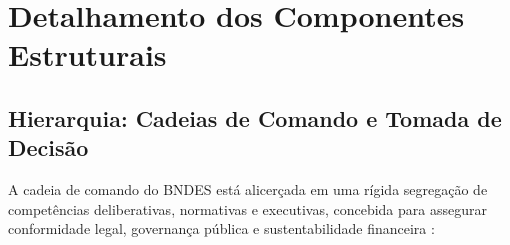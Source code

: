 
\section{Detalhamento dos Componentes Estruturais}

\subsection{Hierarquia: Cadeias de Comando e Tomada de Decisão}

A cadeia de comando do BNDES está alicerçada em uma rígida segregação de competências deliberativas, normativas e executivas, concebida para assegurar conformidade legal, governança pública e sustentabilidade financeira \cite{bndes2025estatuto, bndes2026oib}:

